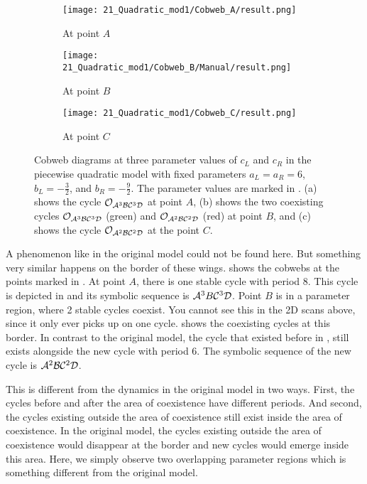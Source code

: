 \begin{figure}
	\centering
	\begin{subfigure}{0.3\textwidth}
		\centering
		\texttt{[image: 21\_Quadratic\_mod1/Cobweb\_A/result.png]}
		\caption{At point $A$}
		\label{fig:setup.quad.even.cobweb.A}
	\end{subfigure}
	\begin{subfigure}{0.3\textwidth}
		\centering
		\texttt{[image: 21\_Quadratic\_mod1/Cobweb\_B/Manual/result.png]}
		\caption{At point $B$}
		\label{fig:setup.quad.even.cobweb.B}
	\end{subfigure}
	\begin{subfigure}{0.3\textwidth}
		\centering
		\texttt{[image: 21\_Quadratic\_mod1/Cobweb\_C/result.png]}
		\caption{At point $C$}
		\label{fig:setup.quad.even.cobweb.C}
	\end{subfigure}
	\caption[Cobwebs of the even quadratic model]{
		Cobweb diagrams at three parameter values of $c_L$ and $c_R$ in the piecewise quadratic model with fixed parameters $a_L = a_R = 6$, $b_L = -\frac{3}{2}$, and $b_R = -\frac{9}{2}$.
		The parameter values are marked in .
		(a) shows the cycle $\mathcal{O}_{\mathcal{A}^3\mathcal{B}\mathcal{C}^3\mathcal{D}}$ at point $A$, (b) shows the two coexisting cycles $\mathcal{O}_{\mathcal{A}^3\mathcal{B}\mathcal{C}^3\mathcal{D}}$ (green) and $\mathcal{O}_{\mathcal{A}^2\mathcal{B}\mathcal{C}^2\mathcal{D}}$ (red) at point $B$, and (c) shows the cycle $\mathcal{O}_{\mathcal{A}^2\mathcal{B}\mathcal{C}^2\mathcal{D}}$ at the point $C$.
	}
	\label{fig:setup.quad.even.cobwebs}
\end{figure}

A phenomenon like in the original model could not be found here.
But something very similar happens on the border of these wings.
 shows the cobwebs at the points marked in .
At point $A$, there is one stable cycle with period 8.
This cycle is depicted in  and its symbolic sequence is $\mathcal{A}^3B\mathcal{C}^3\mathcal{D}$.
Point $B$ is in a parameter region, where 2 stable cycles coexist.
You cannot see this in the 2D scans above, since it only ever picks up on one cycle.
 shows the coexisting cycles at this border.
In contrast to the original model, the cycle that existed before in , still exists alongside the new cycle with period 6.
The symbolic sequence of the new cycle is $\mathcal{A}^2\mathcal{B}\mathcal{C}^2\mathcal{D}$.


This is different from the dynamics in the original model in two ways.
First, the cycles before and after the area of coexistence have different periods.
And second, the cycles existing outside the area of coexistence still exist inside the area of coexistence.
In the original model, the cycles existing outside the area of coexistence would disappear at the border and new cycles would emerge inside this area.
Here, we simply observe two overlapping parameter regions which is something different from the original model.
